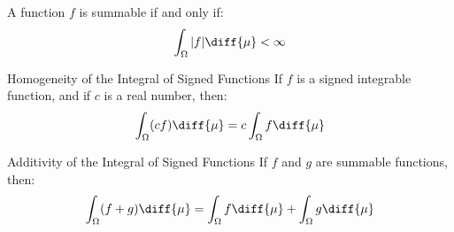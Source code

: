             \begin{theorem}
                A function $f$ is summable if and only if:
                \begin{equation}
                    \int_{\Omega}|f|\diff{\mu}<\infty
                \end{equation}
            \end{theorem}
            \begin{ltheorem}{Homogeneity of the Integral of Signed Functions}
                If $f$ is a signed integrable function, and if $c$ is a
                real number, then:
                \begin{equation}
                    \int_{\Omega}(cf)\diff{\mu}=
                    c\int_{\Omega}f\diff{\mu}
                \end{equation}
            \end{ltheorem}
            \begin{ltheorem}{Additivity of the Integral of Signed Functions}
                If $f$ and $g$ are summable functions, then:
                \begin{equation}
                    \int_{\Omega}(f+g)\diff{\mu}
                    =\int_{\Omega}f\diff{\mu}+\int_{\Omega}g\diff{\mu}
                \end{equation}
            \end{ltheorem}
